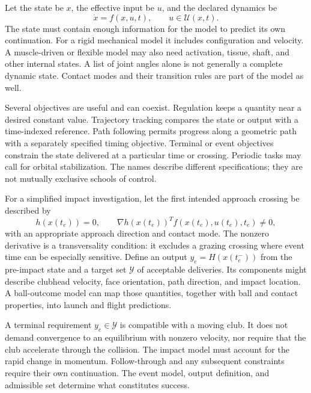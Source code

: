 \documentclass[12pt, openany]{book}
\theoremstyle{plain}
\begin{document}
Let the state be $x$, the effective input be $u$, and the declared dynamics be
\begin{equation}
 \dot x=f(x,u,t),\qquad u\in\mathcal U(x,t).
 \label{eq:nonlinear_sys}
\end{equation}
The state must contain enough information for the model to predict its own
continuation. For a rigid mechanical model it includes configuration and
velocity. A muscle-driven or flexible model may also need activation, tissue,
shaft, and other internal states. A list of joint angles alone is not generally
a complete dynamic state. Contact modes and their transition rules are part
of the model as well.

Several objectives are useful and can coexist. Regulation keeps a quantity
near a desired constant value. Trajectory tracking compares the state or output
with a time-indexed reference. Path following permits progress along a geometric
path with a separately specified timing objective. Terminal or event objectives
constrain the state delivered at a particular time or crossing. Periodic tasks
may call for orbital stabilization. The names describe different specifications;
they are not mutually exclusive schools of control.

For a simplified impact investigation, let the first intended approach crossing
be described by
\begin{equation}
 h(x(t_e))=0,\qquad \nabla h(x(t_e))^Tf(x(t_e),u(t_e),t_e)\ne0,
 \label{eq:motion_impact_event}
\end{equation}
with an appropriate approach direction and contact mode. The nonzero derivative
is a transversality condition: it excludes a grazing crossing where event time
can be especially sensitive. Define an output $y_e=H(x(t_e^-))$ from the
pre-impact state and a target set $\mathcal Y$ of acceptable deliveries. Its
components might describe clubhead velocity, face orientation, path direction,
and impact location. A ball-outcome model can map those quantities, together
with ball and contact properties, into launch and flight predictions.

A terminal requirement $y_e\in\mathcal Y$ is compatible with a moving club.
It does not demand convergence to an equilibrium with nonzero velocity, nor
require that the club accelerate through the collision. The impact model must
account for the rapid change in momentum. Follow-through and any subsequent
constraints require their own continuation. The event model, output definition,
and admissible set determine what constitutes success.
\end{document}
